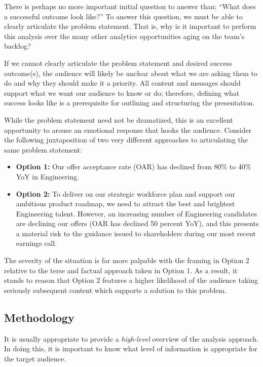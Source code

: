\documentclass[
]{book}
\begin{document}
There is perhaps no more important initial question to answer than: ``What does a successful outcome look like?'' To answer this question, we must be able to clearly articulate the problem statement. That is, why is it important to perform this analysis over the many other analytics opportunities aging on the team's backlog?

If we cannot clearly articulate the problem statement and desired success outcome(s), the audience will likely be unclear about what we are asking them to do and why they should make it a priority. All content and messages should support what we want our audience to know or do; therefore, defining what success looks like is a prerequisite for outlining and structuring the presentation.

While the problem statement need not be dramatized, this is an excellent opportunity to arouse an emotional response that hooks the audience. Consider the following juxtaposition of two very different approaches to articulating the same problem statement:

\begin{itemize}
\item
  \textbf{Option 1:} Our offer acceptance rate (OAR) has declined from 80\% to 40\% YoY in Engineering.
\item
  \textbf{Option 2:} To deliver on our strategic workforce plan and support our ambitious product roadmap, we need to attract the best and brightest Engineering talent. However, an increasing number of Engineering candidates are declining our offers (OAR has declined 50 percent YoY), and this presents a material risk to the guidance issued to shareholders during our most recent earnings call.
\end{itemize}

The severity of the situation is far more palpable with the framing in Option 2 relative to the terse and factual approach taken in Option 1. As a result, it stands to reason that Option 2 features a higher likelihood of the audience taking seriously subsequent content which supports a solution to this problem.

\hypertarget{methodology}{%
\subsection{Methodology}\label{methodology}}

It is usually appropriate to provide a \emph{high-level} overview of the analysis approach. In doing this, it is important to know what level of information is appropriate for the target audience.
\end{document}
